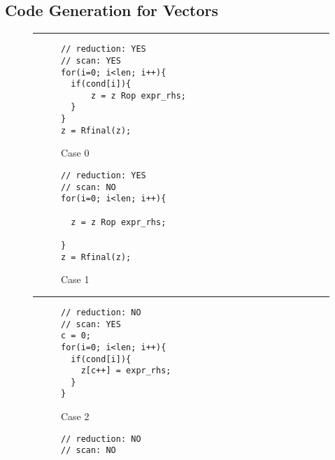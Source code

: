 \subsection{Code Generation for Vectors} \label{SubSec:CodeGen}


\begin{figure}[htbp]
\par\noindent\rule{\columnwidth}{0.6pt}
\begin{subfigure}[t]{.45\columnwidth}
\begin{small}
\begin{verbatim}
// reduction: YES
// scan: YES
for(i=0; i<len; i++){
  if(cond[i]){
      z = z Rop expr_rhs;
  }
}
z = Rfinal(z);
\end{verbatim}
\end{small}
\caption{Case 0} \label{fig:codegen_c0}
\end{subfigure}
\hspace{1mm}
\hspace{2mm}
\begin{subfigure}[t]{.45\columnwidth}
\begin{small}
\begin{verbatim}
// reduction: YES
// scan: NO
for(i=0; i<len; i++){

  z = z Rop expr_rhs;

}
z = Rfinal(z);
\end{verbatim}
\end{small}
\caption{Case 1} \label{fig:codegen_c1}
\end{subfigure}
\par\noindent\rule{\columnwidth}{0.6pt}
\begin{subfigure}[t]{.45\columnwidth}
\begin{small}
\begin{verbatim}
// reduction: NO
// scan: YES
c = 0;
for(i=0; i<len; i++){
  if(cond[i]){
    z[c++] = expr_rhs;
  }
}
\end{verbatim}
\end{small}
\caption{Case 2} \label{fig:codegen_c2}
\end{subfigure}
\hspace{1mm}
\hspace{2mm}
\begin{subfigure}[t]{.45\columnwidth}
\begin{small}
\begin{verbatim}
// reduction: NO
// scan: NO


\end{verbatim}
\end{small}
\end{subfigure}
\end{figure}
